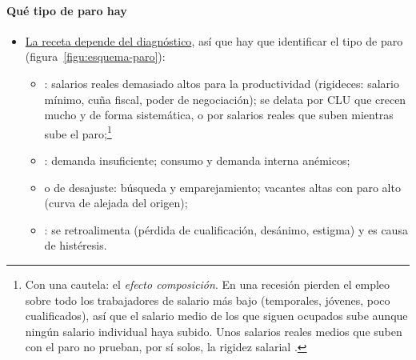 \documentclass[11pt]{article}
\begin{document}
\paragraph{Qué tipo de paro hay}
\begin{itemize}
\item \uline{La receta depende del diagnóstico}, así que hay que identificar el tipo de paro (figura~\ref{figu:esquema-paro}):
  \begin{itemize}
  \item {}: salarios reales demasiado altos para la productividad (rigideces: salario mínimo, cuña fiscal, poder de negociación); se delata por CLU que crecen mucho y de forma sistemática, o por salarios reales que suben mientras sube el paro;\footnote{Con una cautela: el \emph{efecto composición}. En una recesión pierden el empleo sobre todo los trabajadores de salario más bajo (temporales, jóvenes, poco cualificados), así que el salario medio de los que siguen ocupados sube aunque ningún salario individual haya subido. Unos salarios reales medios que suben con el paro no prueban, por sí solos, la rigidez salarial \parencite{Solon1994Composicion}.}
  \item {}: demanda insuficiente; consumo y demanda interna anémicos;
  \item {} o de desajuste: búsqueda y emparejamiento; vacantes altas con paro alto (curva de  alejada del origen);
  \item {}: se retroalimenta (pérdida de cualificación, desánimo, estigma) y es causa de histéresis.
  \end{itemize}
\end{itemize}

\begin{infografia}[!htb]
\centering
\caption{Tipos de paro: cómo se detectan y qué receta tienen}\label{figu:esquema-paro}
\end{infografia}
\end{document}
